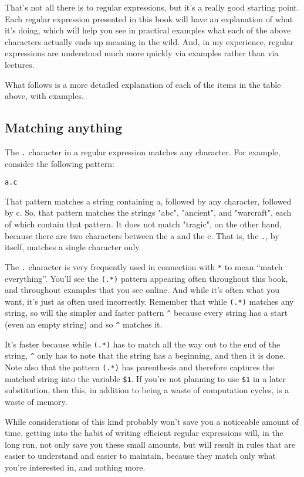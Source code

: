 That's not all there is to regular expressions, but it's a really good starting point. 
Each regular expression presented in this book will have an explanation of what it's doing, 
which will help you see in practical examples what each of the above characters actually ends 
up meaning in the wild. And, in my experience, regular expressions are understood much 
more quickly via examples rather than via lectures.

What follows is a more detailed explanation of each of the items in the table above, with 
examples.

\subsection{Matching anything}

The \verb=.= character in a regular expression matches any character. For example, consider the 
following pattern:

\verb=a.c=

That pattern matches a string containing a, followed by any character, followed by c. So, 
that pattern matches the strings "abc", "ancient", and "warcraft", each of which contain 
that pattern. It does not match "tragic", on the other hand, because there are two characters 
between the a and the c. That is, the \verb=.=, by itself, matches a single character only.

The \verb=.= character is very frequently used in connection with
\verb=*= to mean ``match everything''. You'll see the \verb=(.*)=
pattern appearing often throughout this book, and throughout examples
that you see online. And while it's often what you want, it's just as
often used incorrectly. Remember that while \verb=(.*)= matches any
string, so will the simpler and faster pattern \verb=^= because every
string has a start (even an empty string) and so \verb=^= matches it.

It's faster because while \verb=(.*)= has to match all the way out to
the end of the string, \verb=^= only has to note that the string has a
beginning, and then it is done. Note also that the pattern \verb=(.*)=
has parenthesis and therefore captures the matched string into the
variable \verb=$1=. If you're not planning to use \verb=$1= in a later
substitution, then this, in addition to being a waste of computation
cycles, is a waste of memory.

While considerations of this kind probably won't save you a noticeable
amount of time, getting into the habit of writing efficient regular
expressions will, in the long run, not only save you these small
amounts, but will result in rules that are easier to understand and
easier to maintain, because they match only what you're interested in,
and nothing more.

